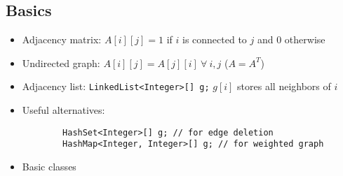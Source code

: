 \subsection{Basics}
\begin{itemize}
    \item Adjacency matrix: $A[i][j] = 1$ if $i$ is connected to $j$ and $0$ otherwise
    \item Undirected graph: $A[i][j] = A[j][i]\ \forall\ i,j$ ($A = A^T$)
    \item Adjacency list: \lstinline|LinkedList<Integer>[] g;|
    $g[i]$ stores all neighbors of $i$

    \item Useful alternatives:
    \begin{lstlisting}
        HashSet<Integer>[] g; // for edge deletion
        HashMap<Integer, Integer>[] g; // for weighted graph
    \end{lstlisting}
    \item Basic classes
    
\end{itemize}

